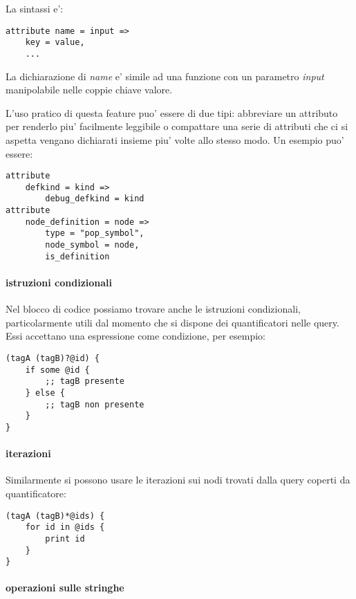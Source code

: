 La sintassi e':

\begin{verbatim}
attribute name = input =>
    key = value,
    ...
\end{verbatim}

La dichiarazione di \emph{name} e' simile ad una funzione con un parametro \emph{input} manipolabile nelle coppie chiave valore.

L'uso pratico di questa feature puo' essere di due tipi: abbreviare un attributo per renderlo piu' facilmente leggibile o compattare una serie di attributi che ci si aspetta vengano dichiarati insieme piu' volte allo stesso modo. Un esempio puo' essere:

\begin{verbatim}
attribute
    defkind = kind =>
        debug_defkind = kind
attribute
    node_definition = node =>
        type = "pop_symbol",
        node_symbol = node,
        is_definition
\end{verbatim}

\paragraph{istruzioni condizionali}

Nel blocco di codice possiamo trovare anche le istruzioni condizionali, particolarmente utili dal momento che si dispone dei quantificatori nelle query.
Essi accettano una espressione come condizione, per esempio:

\begin{verbatim}
(tagA (tagB)?@id) {
    if some @id {
        ;; tagB presente
    } else {
        ;; tagB non presente
    }
}
\end{verbatim}

\paragraph{iterazioni}

Similarmente si possono usare le iterazioni sui nodi trovati dalla query coperti da quantificatore:

\begin{verbatim}
(tagA (tagB)*@ids) {
    for id in @ids {
        print id
    }
}
\end{verbatim}

\paragraph{operazioni sulle stringhe}

